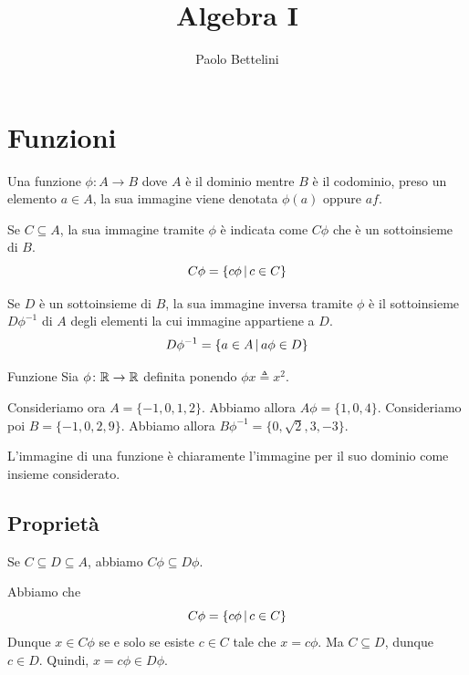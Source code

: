 \documentclass[a4paper]{article}
\title{Algebra I}
\author{Paolo Bettelini}
\date{}
\begin{document}
\maketitle
\tableofcontents

\section{Funzioni}

Una funzione \(\phi\colon A \to B\) dove \(A\) è il dominio mentre \(B\) è il codominio,
preso un elemento \(a\in A\), la sua immagine viene denotata \(\phi(a)\) oppure \(af\).

Se \(C \subseteq A\), la sua immagine tramite \(\phi\) è indicata come \(C\phi\)
che è un sottoinsieme di \(B\).
\[
    C\phi = \{  c\phi \,|\, c\in C \}
\]

Se \(D\) è un sottoinsieme di \(B\), la sua immagine inversa tramite \(\phi\)
è il sottoinsieme \(D\phi^{-1}\) di \(A\) degli elementi la cui immagine appartiene a \(D\).
\[
    D\phi^{-1} = \{  a \in A \,|\, a\phi \in D \}
\]

\begin{snippetexample}{Funzione}
    Sia \(\phi\colon \mathbb{R} \to \mathbb{R}\) definita ponendo \(\phi x \triangleq x^2\).
\end{snippetexample}

Consideriamo ora \(A=\{-1,0,1,2\}\). Abbiamo allora \(A\phi = \{1,0,4\}\).
Consideriamo poi \(B=\{-1, 0, 2, 9\}\). Abbiamo allora \(B\phi^{-1} = \{0, \sqrt{2}, 3, -3\}\).

L'immagine di una funzione è chiaramente l'immagine per il suo dominio come insieme considerato.

\subsection{Proprietà}

\begin{snippetproposition}{}
    Se \(C \subseteq D \subseteq A\), abbiamo \(C\phi \subseteq D\phi\).
\end{snippetproposition}

\begin{snippetproof}{}
    Abbiamo che
    \[
        C\phi = \{c\phi \,|\, c\in C\}
    \]
    Dunque \(x\in C\phi\) se e solo se esiste \(c\in C\) tale che \(x=c\phi\).
    Ma \(C \subseteq D\), dunque \(c \in D\). Quindi, \(x = c\phi \in D\phi\).
\end{snippetproof}
\end{document}
